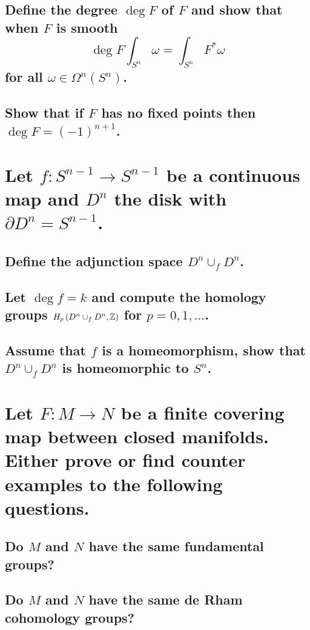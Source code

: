 \documentclass[10pt]{article}
\begin{document}
\subsection{Define the degree $\deg F$ of $F$ and show that when $F$ is smooth
  $$\deg F \int_{S^n} \omega = \int_{S^n} F^* \omega$$
  for all $\omega \in \Omega^n(S^n)$.}

\subsection{Show that if $F$ has no fixed points then $\deg F = (-1)^{n+1}$.}

\section{Let $f: S^{n-1} \to S^{n-1}$ be a continuous map and $D^n$ the disk with $\partial D^n =
  S^{n-1}$.}

\subsection{Define the adjunction space $D^n \cup_f D^n$.}

\subsection{Let $\deg f=k$ and compute the homology groups $H_p\left( D^n \cup_f D^n, \mathbb{Z}
  \right)$ for $p = 0,1,\dots$.}

\subsection{Assume that $f$ is a homeomorphism, show that $D^n \cup_f D^n$ is homeomorphic to
  $S^n$.}

\section{Let $F: M \to N$ be a finite covering map between closed manifolds. Either prove or find
  counter examples to the following questions.}

\subsection{Do $M$ and $N$ have the same fundamental groups?}

\subsection{Do $M$ and $N$ have the same de Rham cohomology groups?}
\end{document}
